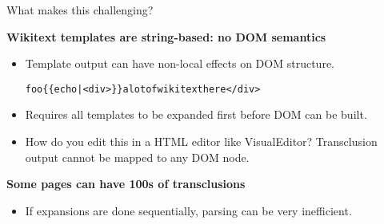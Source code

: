 \documentclass[t,xcolor=dvipsnames]{beamer}
\newcommand{\WT}[2][\small]{\color{blue} #1{\tt #2}}
\newenvironment{wikitext}[1][\small]%
{\begin{alltt}\bgroup\color{blue}#1}%
{\egroup\end{alltt}}
\begin{document}
\begin{frame}{What makes this challenging?}

{\bf Wikitext templates are string-based: no DOM semantics}
\begin{itemize}
  \item Template output can have non-local effects on DOM structure.
    \begin{wikitext}
    foo \{\{echo|<div>\}\} a lot of wikitext here </div>
    \end{wikitext}
  \item Requires all templates to be expanded first before DOM can be built.
  \item How do you edit this in a HTML editor like VisualEditor? Transclusion output cannot be mapped to any DOM node.
\end{itemize}

{\bf Some pages can have 100s of transclusions}
\begin{itemize}
  \item If expansions are done sequentially, parsing can be very inefficient.
\end{itemize}

\end{frame}
\end{document}
